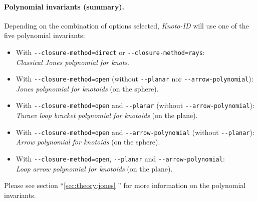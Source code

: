 \paragraph{Polynomial invariants (summary).}
Depending on the combination of options selected, {\it Knoto-ID} will use one of the five polynomial invariants:
\begin{itemize}
\item With \lstinline{--closure-method=direct} or  \lstinline{--closure-method=rays}:\\
  \emph{ Classical Jones polynomial for knots}.
\item With \lstinline{--closure-method=open} (without \lstinline{--planar} nor \lstinline{--arrow-polynomial}):\\
  \emph{Jones polynomial for knotoids} (on the sphere).
\item With \lstinline{--closure-method=open} and  \lstinline{--planar} (without \lstinline{--arrow-polynomial}):\\
  \emph{Turaev loop bracket polynomial for knotoids} (on the plane).
\item With \lstinline{--closure-method=open} and \lstinline{--arrow-polynomial} (without \lstinline{--planar}):\\
  \emph{Arrow polynomial for knotoids} (on the sphere).
\item With \lstinline{--closure-method=open}, \lstinline{--planar} and \lstinline{--arrow-polynomial}:\\
  \emph{Loop arrow polynomial for knotoids} (on the plane).
\end{itemize}
Please see section ``\ref{sec:theory:jones} '' for more information on the polynomial invariants.

